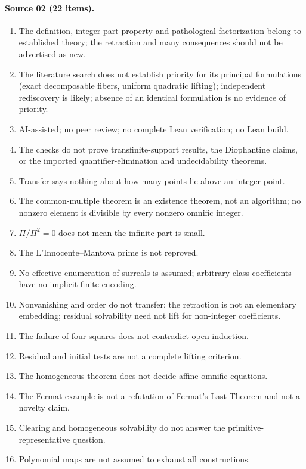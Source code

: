 \documentclass[11pt,oneside]{article}
\numberwithin{equation}{section}
\theoremstyle{definition}
\theoremstyle{remark}
\begin{document}
\paragraph{Source 02 (22 items).}
\begin{enumerate}[leftmargin=*,itemsep=1pt]
\item The definition, integer-part property and pathological factorization
belong to established theory; the retraction and many consequences should not
be advertised as new.
\item The literature search does not establish priority for its principal
formulations (exact decomposable fibers, uniform quadratic lifting);
independent rediscovery is likely; absence of an identical formulation is no
evidence of priority.
\item AI-assisted; no peer review; no complete Lean verification; no Lean
build.
\item The checks do not prove transfinite-support results, the Diophantine
claims, or the imported quantifier-elimination and undecidability theorems.
\item Transfer says nothing about how many points lie above an integer point.
\item The common-multiple theorem is an existence theorem, not an algorithm;
no nonzero element is divisible by every nonzero omnific integer.
\item $\Pi/\Pi^2=0$ does not mean the infinite part is small.
\item The L'Innocente--Mantova prime is not reproved.
\item No effective enumeration of surreals is assumed; arbitrary class
coefficients have no implicit finite encoding.
\item Nonvanishing and order do not transfer; the retraction is not an
elementary embedding; residual solvability need not lift for non-integer
coefficients.
\item The failure of four squares does not contradict open induction.
\item Residual and initial tests are not a complete lifting criterion.
\item The homogeneous theorem does not decide affine omnific equations.
\item The Fermat example is not a refutation of Fermat's Last Theorem and not
a novelty claim.
\item Clearing and homogeneous solvability do not answer the
primitive-representative question.
\item Polynomial maps are not assumed to exhaust all constructions.

\end{enumerate}
\end{document}
